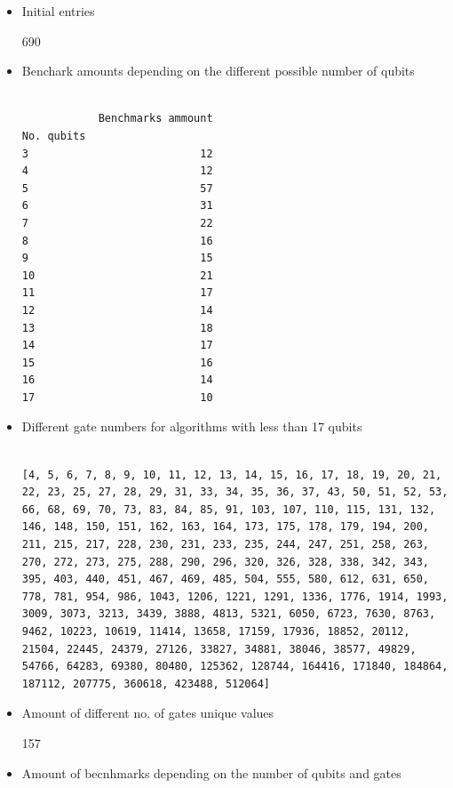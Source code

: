 \begin{itemize}
\item Initial entries
\label{sec:org0de7617}

690


\item Benchark amounts depending on the different possible number of qubits
\label{sec:org7aec0d1}

\begin{verbatim}

            Benchmarks ammount
No. qubits
3                           12
4                           12
5                           57
6                           31
7                           22
8                           16
9                           15
10                          21
11                          17
12                          14
13                          18
14                          17
15                          16
16                          14
17                          10

\end{verbatim}

\item Different gate numbers for algorithms with less than 17 qubits
\label{sec:orgc90bc66}

\begin{verbatim}

[4, 5, 6, 7, 8, 9, 10, 11, 12, 13, 14, 15, 16, 17, 18, 19, 20, 21, 22, 23, 25, 27, 28, 29, 31, 33, 34, 35, 36, 37, 43, 50, 51, 52, 53, 66, 68, 69, 70, 73, 83, 84, 85, 91, 103, 107, 110, 115, 131, 132, 146, 148, 150, 151, 162, 163, 164, 173, 175, 178, 179, 194, 200, 211, 215, 217, 228, 230, 231, 233, 235, 244, 247, 251, 258, 263, 270, 272, 273, 275, 288, 290, 296, 320, 326, 328, 338, 342, 343, 395, 403, 440, 451, 467, 469, 485, 504, 555, 580, 612, 631, 650, 778, 781, 954, 986, 1043, 1206, 1221, 1291, 1336, 1776, 1914, 1993, 3009, 3073, 3213, 3439, 3888, 4813, 5321, 6050, 6723, 7630, 8763, 9462, 10223, 10619, 11414, 13658, 17159, 17936, 18852, 20112, 21504, 22445, 24379, 27126, 33827, 34881, 38046, 38577, 49829, 54766, 64283, 69380, 80480, 125362, 128744, 164416, 171840, 184864, 187112, 207775, 360618, 423488, 512064]

\end{verbatim}

\item Amount of different no. of gates unique values
\label{sec:org722bad4}

157

\item Amount of becnhmarks depending on the number of qubits and gates
\label{sec:orgf1d3ab5}


\end{itemize}
